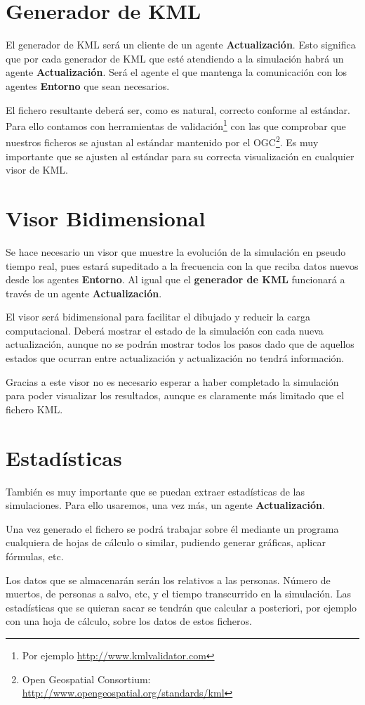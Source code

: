 \section{Generador de KML}

El generador de KML será un cliente de un agente {\bf Actualización}. Esto
significa que por cada generador de KML que esté atendiendo a la simulación
habrá un agente {\bf Actualización}. Será el agente el que mantenga la
comunicación con los agentes {\bf Entorno} que sean necesarios.

El fichero resultante deberá ser, como es natural, correcto conforme al
estándar. Para ello contamos con herramientas de
validación\footnote{Por ejemplo \url{http://www.kmlvalidator.com}} con las que
comprobar que nuestros ficheros se ajustan al estándar mantenido por el
OGC\footnote{Open Geospatial Consortium:
\url{http://www.opengeospatial.org/standards/kml}}. Es muy importante que se
ajusten al estándar para su correcta visualización en cualquier visor de KML.

\section{Visor Bidimensional}

Se hace necesario un visor que muestre la evolución de la simulación en pseudo
tiempo real, pues estará supeditado a la frecuencia con la que reciba datos
nuevos desde los agentes {\bf Entorno}. Al igual que el {\bf generador de KML}
funcionará a través de un agente {\bf Actualización}.

El visor será bidimensional para facilitar el dibujado y reducir la carga
computacional. Deberá mostrar el estado de la simulación con cada nueva
actualización, aunque no se podrán mostrar todos los pasos dado que de aquellos
estados que ocurran entre actualización y actualización no tendrá información.

Gracias a este visor no es necesario esperar a haber completado la simulación
para poder visualizar los resultados, aunque es claramente más limitado que el
fichero KML.

\section{Estadísticas}

También es muy importante que se puedan extraer estadísticas de las
simulaciones. Para ello usaremos, una vez más, un agente {\bf Actualización}.

Una vez generado el fichero se podrá trabajar sobre él mediante un programa
cualquiera de hojas de cálculo o similar, pudiendo generar gráficas, aplicar
fórmulas, etc.

Los datos que se almacenarán serán los relativos a las personas. Número de
muertos, de personas a salvo, etc, y el tiempo transcurrido en la simulación.
Las estadísticas que se quieran sacar se tendrán que calcular a posteriori, por
ejemplo con una hoja de cálculo, sobre los datos de estos ficheros.

